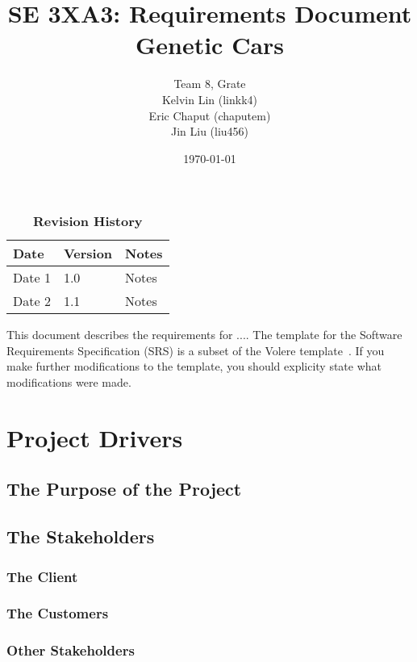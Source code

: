 \documentclass[12pt, titlepage]{article}
\title{SE 3XA3: Requirements Document\\Genetic Cars}
\author{Team 8, Grate
		\\ Kelvin Lin (linkk4)
		\\ Eric Chaput (chaputem)
		\\ Jin Liu (liu456)
}
\date{\today}
\begin{document}
\maketitle

\tableofcontents
\listoftables
\listoffigures

\begin{table}[bp]
\caption{\bf Revision History}
\begin{tabularx}{\textwidth}{p{3cm}p{2cm}X}
\toprule {\bf Date} & {\bf Version} & {\bf Notes}\\
\midrule
Date 1 & 1.0 & Notes\\
Date 2 & 1.1 & Notes\\
\bottomrule
\end{tabularx}
\end{table}

\newpage


This document describes the requirements for ....  The template for the Software
Requirements Specification (SRS) is a subset of the Volere
template~\citep{RobertsonAndRobertson2012}.  If you make further modifications
to the template, you should explicity state what modifications were made.

\section{Project Drivers}

\subsection{The Purpose of the Project}

\subsection{The Stakeholders}

\subsubsection{The Client}

\subsubsection{The Customers}

\subsubsection{Other Stakeholders}
\end{document}
